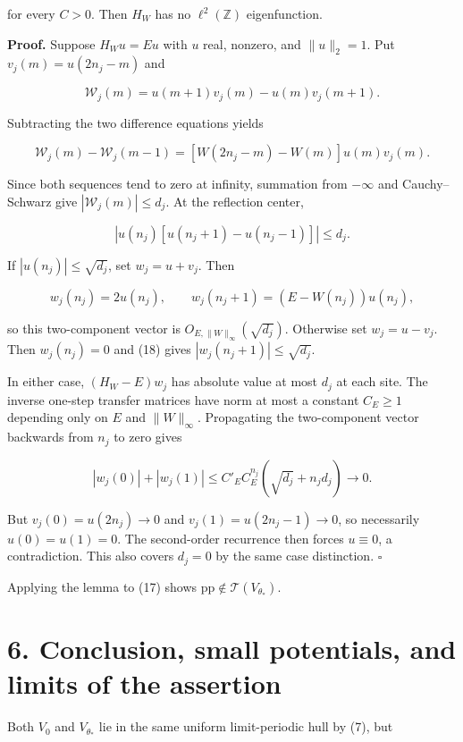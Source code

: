 \documentclass[11pt,a4paper]{article}
\begin{document}
for every \(C>0\). Then \(H_W\) has no \(\ell^2(\mathbb Z)\)
eigenfunction.

\textbf{Proof.} Suppose \(H_Wu=Eu\) with \(u\) real, nonzero, and
\(\|u\|_2=1\). Put \(v_j(m)=u(2n_j-m)\) and

\[
\mathcal W_j(m)=u(m+1)v_j(m)-u(m)v_j(m+1).
\]

Subtracting the two difference equations yields

\[
\mathcal W_j(m)-\mathcal W_j(m-1)
=[W(2n_j-m)-W(m)]u(m)v_j(m).
\]

Since both sequences tend to zero at infinity, summation from
\(-\infty\) and Cauchy--Schwarz give \(|\mathcal W_j(m)|\leq d_j\). At
the reflection center,

\[
|u(n_j)[u(n_j+1)-u(n_j-1)]|\leq d_j.
\tag{18}
\]

If \(|u(n_j)|\leq\sqrt{d_j}\), set \(w_j=u+v_j\). Then

\[
w_j(n_j)=2u(n_j),\qquad
w_j(n_j+1)=(E-W(n_j))u(n_j),
\]

so this two-component vector is \(O_{E,\|W\|_\infty}(\sqrt{d_j})\).
Otherwise set \(w_j=u-v_j\). Then \(w_j(n_j)=0\) and (18) gives
\(|w_j(n_j+1)|\leq\sqrt{d_j}\).

In either case, \((H_W-E)w_j\) has absolute value at most \(d_j\) at
each site. The inverse one-step transfer matrices have norm at most a
constant \(C_E\geq1\) depending only on \(E\) and \(\|W\|_\infty\).
Propagating the two-component vector backwards from \(n_j\) to zero
gives

\[
|w_j(0)|+|w_j(1)|
\leq C'_E C_E^{n_j}(\sqrt{d_j}+n_jd_j)\longrightarrow0.
\]

But \(v_j(0)=u(2n_j)\to0\) and \(v_j(1)=u(2n_j-1)\to0\), so necessarily
\(u(0)=u(1)=0\). The second-order recurrence then forces \(u\equiv0\), a
contradiction. This also covers \(d_j=0\) by the same case distinction.
\(\square\)

Applying the lemma to (17) shows
\(\mathrm{pp}\notin\mathcal T(V_{\theta_*})\).

\hypertarget{1018-conclusion-small-potentials-and-limits-of-the-assertion}{%
\section{6. Conclusion, small potentials, and limits of the
assertion}\label{1018-conclusion-small-potentials-and-limits-of-the-assertion}}

Both \(V_0\) and \(V_{\theta_*}\) lie in the same uniform limit-periodic
hull by (7), but
\end{document}
